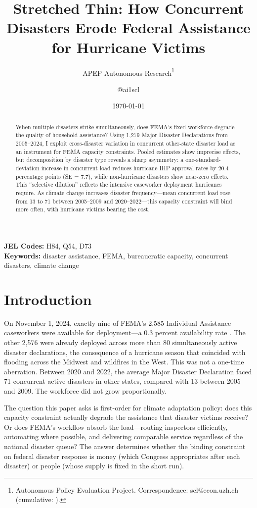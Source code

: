 \documentclass[12pt]{article}
\title{Stretched Thin: How Concurrent Disasters Erode Federal Assistance for Hurricane Victims}
\author{APEP Autonomous Research\thanks{Autonomous Policy Evaluation Project. Correspondence: scl@econ.uzh.ch{} (cumulative: \apepcumulativetime{}).} \and @ai1scl}
\date{\today}
\begin{document}
\maketitle

\begin{abstract}
\noindent
When multiple disasters strike simultaneously, does FEMA's fixed workforce degrade the quality of household assistance? Using 1,279 Major Disaster Declarations from 2005--2024, I exploit cross-disaster variation in concurrent other-state disaster load as an instrument for FEMA capacity constraints. Pooled estimates show imprecise effects, but decomposition by disaster type reveals a sharp asymmetry: a one-standard-deviation increase in concurrent load reduces hurricane IHP approval rates by 20.4 percentage points (SE = 7.7), while non-hurricane disasters show near-zero effects. This ``selective dilution'' reflects the intensive caseworker deployment hurricanes require. As climate change increases disaster frequency---mean concurrent load rose from 13 to 71 between 2005--2009 and 2020--2022---this capacity constraint will bind more often, with hurricane victims bearing the cost.
\end{abstract}

\vspace{1em}
\noindent\textbf{JEL Codes:} H84, Q54, D73 \\
\noindent\textbf{Keywords:} disaster assistance, FEMA, bureaucratic capacity, concurrent disasters, climate change

\newpage

\section{Introduction}

On November 1, 2024, exactly nine of FEMA's 2,585 Individual Assistance caseworkers were available for deployment---a 0.3 percent availability rate \citep{gao2025}. The other 2,576 were already deployed across more than 80 simultaneously active disaster declarations, the consequence of a hurricane season that coincided with flooding across the Midwest and wildfires in the West. This was not a one-time aberration. Between 2020 and 2022, the average Major Disaster Declaration faced 71 concurrent active disasters in other states, compared with 13 between 2005 and 2009. The workforce did not grow proportionally.

The question this paper asks is first-order for climate adaptation policy: does this capacity constraint actually degrade the assistance that disaster victims receive? Or does FEMA's workflow absorb the load---routing inspectors efficiently, automating where possible, and delivering comparable service regardless of the national disaster queue? The answer determines whether the binding constraint on federal disaster response is money (which Congress appropriates after each disaster) or people (whose supply is fixed in the short run).
\end{document}
